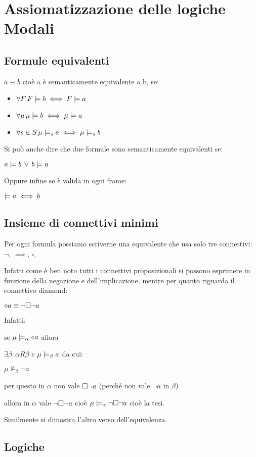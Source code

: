 
\chapter{Assiomatizzazione delle logiche Modali}


\section{Formule equivalenti}

$a\equiv b$ cioè a è semanticamente equivalente a b, se:
\begin{itemize}
\item $\forall F\,F\models b\iff F\models a$
\item $\forall\mu\,\mu\models b\iff\mu\models a$
\item $\forall s\in S\,\mu\models_{s}a\iff\mu\models_{s}b$
\end{itemize}
Si può anche dire che due formule sono semanticamente equivalenti
se:

$a\models b\,\vee\,b\models a$

Oppure infine se è valida in ogni frame:

$\models a\iff b$


\section{Insieme di connettivi minimi}

Per ogni formula possiamo scriverne una equivalente che usa solo tre
connettivi: $\neg,\,\implies,\,\square$.

Infatti come è ben noto tutti i connettivi proposizionali si possono
esprimere in funzione della negazione e dell'implicazione, mentre
per quanto riguarda il connettivo diamond:

$\diamond a\equiv\neg\square\neg a$

Infatti:

se $\mu\models_{\alpha}\diamond a$ allora

$\exists\beta:$$\alpha R\beta$ e $\mu\models_{\beta}a$ da cui:

$\mu\nvDash_{\beta}\neg a$

per questo in $\alpha$ non vale $\square\neg a$ (perché non vale
$\neg a$ in $\beta$)

allora in $\alpha$ vale $\neg\square\neg a$ cioè $\mu\models_{\alpha}\neg\square\neg a$
cioè la tesi. 

Similmente si dimostra l'altro verso dell'equivalenza.


\section{Logiche}


